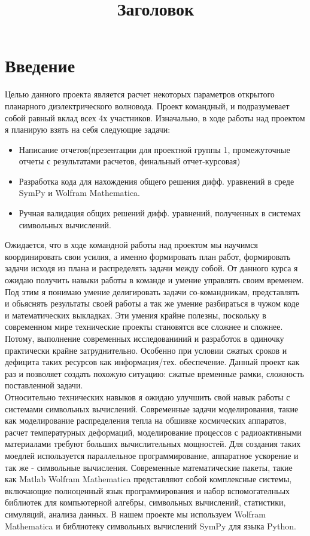 \documentclass{article}
\title{Заголовок}
\begin{document}
\tableofcontents

\newpage

\section{Введение}
Целью данного проекта является расчет некоторых параметров открытого планарного диэлектрического волновода. Проект командный, и подразумевает собой равный вклад всех 4х участников. Изначально, в ходе
работы над проектом я планирую взять на себя следующие задачи:
\begin{itemize}

 \item  Написание отчетов(презентации для проектной группы 1, промежуточные отчеты с результатами расчетов, финальный отчет-курсовая)
 \item  Разработка кода для нахождения общего решения дифф. уравнений в среде SymPy и Wolfram Mathematica.
 \item  Ручная валидация общих решений дифф. уравнений, полученных в системах символьных вычислений.
   
\end{itemize}
Ожидается, что в ходе командной работы над проектом мы научимся координировать свои усилия, а
именно формировать план работ, формировать задачи исходя из плана и распределять задачи между собой.
От данного курса я ожидаю получить навыки работы в команде и умение управлять своим временем. Под
этим я понимаю умение делигировать задачи со-командникам, представлять и обьяснять результаты своей
работы а так же умение разбираться в чужом коде и математических выкладках. Эти умения крайне полезны,
поскольку в современном мире технические проекты становятся все сложнее и сложнее. Потому, выполнение
современных исследованиний и разработок в одиночку практически крайне затруднительно. Особенно при
условии сжатых сроков и дефицита таких ресурсов как информация/тех. обеспечение. Данный проект как
раз и позволяет создать похожую ситуацию: сжатые временные рамки, сложность поставленной задачи.\\[10pt]
Относительно технических навыков я ожидаю улучшить свой навык работы с системами символьных
вычислений. Современные задачи моделирования, такие как моделирование распределения тепла на обшивке космических аппаратов, расчет температурных деформаций, моделирование процессов с радиоактивными материалами требуют больших вычислительных мощностей. Для создания таких моедлей используется
параллельное программирование, аппаратное ускорение и так же - символьные вычисления. Современные
математические пакеты, такие как Matlab Wolfram Mathematica представляют собой комплексные системы,
включающие полноценный язык программирования и набор вспомогателньых библиотек для компьютерной
алгебры, символьных вычислений, статистики, симуляций, анализа данных. В нашем проекте мы используем
Wolfram Mathematica и библиотеку символьных вычислений SymPy для языка Python.
\newpage
\end{document}
